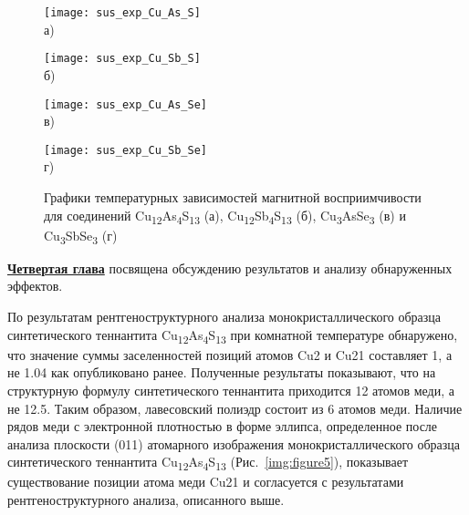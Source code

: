 \begin{figure}[ht]
  \begin{minipage}[ht]{0.5\linewidth}\centering
    \texttt{[image: sus\_exp\_Cu\_As\_S]} \\ а)
  \end{minipage}
  \hfill
  \begin{minipage}[ht]{0.5\linewidth}\centering
    \texttt{[image: sus\_exp\_Cu\_Sb\_S]} \\ б)
  \end{minipage}
\vfill
  \begin{minipage}[ht]{0.5\linewidth}\centering
    \texttt{[image: sus\_exp\_Cu\_As\_Se]} \\ в)
  \end{minipage}
  \hfill
  \begin{minipage}[ht]{0.5\linewidth}\centering
    \texttt{[image: sus\_exp\_Cu\_Sb\_Se]} \\ г)
  \end{minipage}

      \caption[Графики температурных зависимостей магнитной восприимчивости для соединений Cu\textsubscript{12}As\textsubscript{4}S\textsubscript{13} (а), Cu\textsubscript{12}Sb\textsubscript{4}S\textsubscript{13} (б), Cu\textsubscript{3}AsSe\textsubscript{3} (в) и Cu\textsubscript{3}SbSe\textsubscript{3} (г)]{Графики температурных зависимостей магнитной восприимчивости для соединений Cu\textsubscript{12}As\textsubscript{4}S\textsubscript{13} (а), Cu\textsubscript{12}Sb\textsubscript{4}S\textsubscript{13} (б), Cu\textsubscript{3}AsSe\textsubscript{3} (в) и Cu\textsubscript{3}SbSe\textsubscript{3} (г)}
    \label{img:figure3}
\end{figure}




\underline{\textbf{Четвертая глава}} посвящена обсуждению результатов и анализу обнаруженных эффектов.

По результатам рентгеноструктурного анализа монокристаллического образца синтетического теннантита Cu\textsubscript{12}As\textsubscript{4}S\textsubscript{13} при комнатной температуре обнаружено, что значение суммы заселенностей позиций атомов Cu2 и Cu21 составляет 1, а не 1.04 как опубликовано ранее\cite{Makovicky_2006}.
Полученные результаты показывают, что на структурную формулу синтетического теннантита приходится 12 атомов меди, а не 12.5.
Таким образом, лавесовский полиэдр состоит из 6 атомов меди.
Наличие рядов меди с электронной плотностью в форме эллипса, определенное после анализа плоскости (011) атомарного изображения монокристаллического образца синтетического теннантита Cu\textsubscript{12}As\textsubscript{4}S\textsubscript{13} (Рис.~\ref{img:figure5}), показывает существование позиции атома меди Cu21 и согласуется с результатами рентгеноструктурного анализа, описанного выше.

